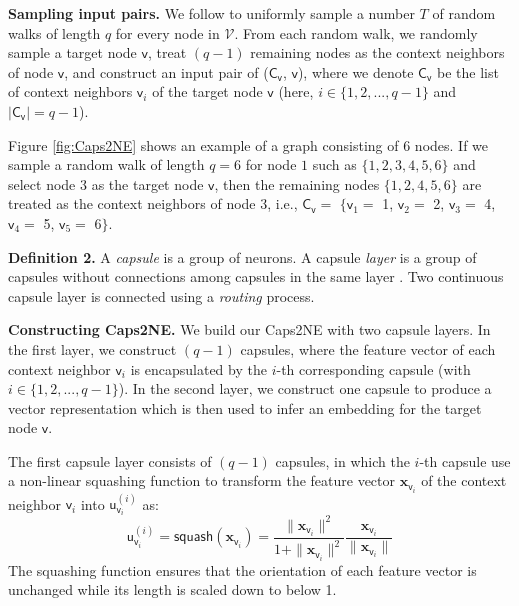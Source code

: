 \documentclass[sigconf]{acmart}
\begin{document}
\textbf{Sampling input pairs.} We follow \citet{Perozzi:2014} to uniformly sample a number $T$ of random walks of length $q$ for every node in $\mathcal{V}$. 
From each random walk, we randomly sample a target node $\mathsf{v}$, treat $(q-1)$ remaining nodes as the context neighbors of node $\mathsf{v}$, and construct an input pair of ($\mathsf{C}_\mathsf{v}$, $\mathsf{v}$), where we denote $\mathsf{C}_\mathsf{v}$ be the list of context neighbors $\mathsf{v}_i$ of the target node $\mathsf{v}$ (here, $i \in \{1, 2, ..., q-1\}$ and $|\mathsf{C}_\mathsf{v}| = q-1$). 

Figure \ref{fig:Caps2NE} shows an example of a graph consisting of 6 nodes.
If we sample a random walk of length $q = 6$ for node $1$ such as $\{1, 2, 3, 4, 5, 6\}$ and select node $3$ as the target node $\mathsf{v}$, then the remaining nodes $\{1, 2, 4, 5, 6\}$ are  treated as the context neighbors of node $3$, i.e., $\mathsf{C}_\mathsf{v} =$ $\{\mathsf{v}_1 =$  1, $\mathsf{v}_2 =$  2, $\mathsf{v}_3 =$  4, $\mathsf{v}_4 =$  5, $\mathsf{v}_5 =$ 6$\}$.


\textbf{Definition 2.} A \textit{capsule} is a group of neurons. A capsule \textit{layer} is a group of capsules without connections among capsules in the same layer \citep{sabour2017dynamic}. Two continuous capsule layer is connected using a \textit{routing} process.

\textbf{Constructing Caps2NE.} We build our Caps2NE with two capsule layers. In the first layer, we construct $(q-1)$ capsules, where the feature vector of each context neighbor $\mathsf{v}_i$ is encapsulated by the $i$-th corresponding capsule (with $i \in \{1, 2, ..., q-1\}$). 
In the second layer, we construct one capsule to produce a vector representation which is then used to infer an embedding for the target node $\mathsf{v}$.


The first capsule layer consists of $(q-1)$ capsules, in which the $i$-th capsule use a non-linear squashing function to transform the feature vector $\boldsymbol{x}_{\mathsf{v}_i}$ of the context neighbor $\mathsf{v}_i$ into $\boldsymbol{\mathsf{u}}_{\mathsf{v}_i}^{(i)}$ as: 
\begin{equation}
    \boldsymbol{\mathsf{u}}_{\mathsf{v}_i}^{(i)} = \mathsf{squash}\left(\boldsymbol{x}_{\mathsf{v}_i}\right) = \frac{\|\boldsymbol{x}_{\mathsf{v}_i}\|^2}{1 + \|\boldsymbol{x}_{\mathsf{v}_i}\|^2}\frac{\boldsymbol{x}_{\mathsf{v}_i}}{\|\boldsymbol{x}_{\mathsf{v}_i}\|}
\label{equa:squash}
\end{equation}
\noindent The squashing function ensures that the orientation of each feature vector is unchanged while its length is scaled down to below 1.
\end{document}
